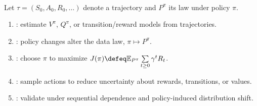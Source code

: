 \begin{remark} \label{rem:sl-rl-learning-systems} \\
Let $\tau=(S_0,A_0,R_0,\ldots)$ denote a trajectory and $P^\pi$ its law under policy $\pi$.
\begin{enumerate}[label=(\roman*)]
\setlength{\itemsep}{0pt}
\item {}: estimate $V^\pi$, $Q^\pi$, or transition/reward models from trajectories.
\item {}: policy changes alter the data law, $\pi\mapsto P^\pi$.
\item {}: choose $\pi$ to maximize $J(\pi)\defeq\mathbb{E}_{P^\pi}\sum\limits_{t\geq0}\gamma^tR_t$.
\item {}: sample actions to reduce uncertainty about rewards, transitions, or values.
\item {}: validate under sequential dependence and policy-induced distribution shift.
\end{enumerate}
\end{remark}
